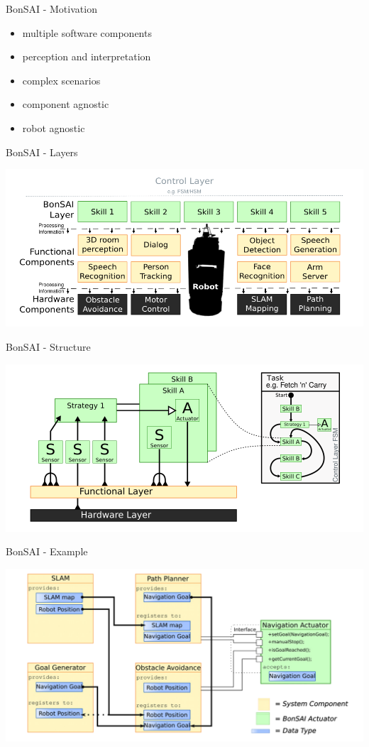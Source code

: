 \begin{frame}[fragile]{BonSAI - Motivation}
	
	\begin{itemize}
		\item multiple software components
		\item perception and interpretation
		\item complex scenarios
		\item component agnostic
		\item robot agnostic
	\end{itemize}
	
\end{frame}

\begin{frame}[fragile]{BonSAI - Layers}

	\includegraphics[scale=0.35]{bonsai_layerCut}

\end{frame}

\begin{frame}[fragile]{BonSAI - Structure}
	
	\includegraphics[scale=0.32]{bonsai_usageCut}
	
\end{frame}

\begin{frame}[fragile]{BonSAI - Example}
	
	\includegraphics[scale=0.23]{bonsai_navCut}
	
\end{frame}